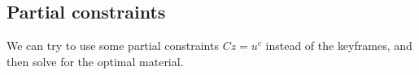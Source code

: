 \documentclass[9pt,twocolumn]{extarticle}
\begin{document}
\subsection{Partial constraints}
We can try to use some partial constraints $Cz = u^c$ instead of the keyframes,
and then solve for the optimal material.


\end{document}
